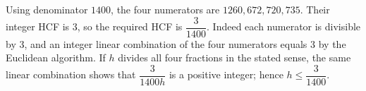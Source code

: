 Using denominator $1400$, the four numerators are $1260,672,720,735$. Their integer HCF is 3, so the required HCF is $\boxed{\dfrac{3}{1400}}$. Indeed each numerator is divisible by 3, and an integer linear combination of the four numerators equals 3 by the Euclidean algorithm. If $h$ divides all four fractions in the stated sense, the same linear combination shows that $\dfrac{3}{1400h}$ is a positive integer; hence $h\le\dfrac{3}{1400}$.
